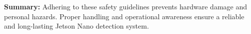 \vspace{0.6cm}
\noindent
\textbf{Summary:}  
Adhering to these safety guidelines prevents hardware damage and personal hazards.  
Proper handling and operational awareness ensure a reliable and long-lasting Jetson Nano detection system.

